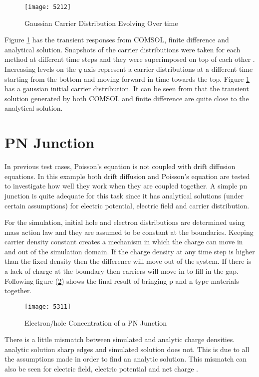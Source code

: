 \begin{doublespace}
\begin{figure}[ht]
\centering
\texttt{[image: 5212]}
\caption{Gaussian Carrier Distribution Evolving Over time} 
\label{51}
\end{figure}

Figure \ref{51} has the transient responses from COMSOL, finite difference and analytical solution. Snapshots of the carrier distributions were taken for each method at different time steps and they were superimposed on top of each other . Increasing levels on the \textit{y} axis represent a carrier distributions at a different time starting from the bottom and moving forward in time towards the top. Figure \ref{51} has a gaussian initial carrier distribution. It can be seen from that the transient solution generated by both COMSOL and finite difference are quite close to the analytical solution.


\clearpage
\section{PN Junction}
In previous test cases, Poisson's equation is not coupled with drift diffusion equations. In this example both drift diffusion and Poisson's equation are tested to investigate how well they work when they are coupled together. A simple pn junction is quite adequate for this task since it has analytical solutions (under certain assumptions) for electric potential, electric field and carrier distribution.

For the simulation, initial hole and electron distributions are determined using mass action law and they are assumed to be constant at the boundaries. Keeping carrier density constant creates a mechanism in which the charge can move in and out of the simulation domain. If the charge density at any time step is higher than the fixed density then the difference will move out of the system. If there is a lack of charge at the boundary then carriers will move in to fill in the gap. Following figure (\ref{npcon}) shows the final result of bringing p and n type materials together. 
 
\begin{figure}[ht]
\centering
\texttt{[image: 5311]}
\caption{Electron/hole Concentration of a PN Junction} 
\label{npcon}
\end{figure}

There is a little mismatch between simulated and analytic charge densities.  analytic solution  sharp edges and  simulated solution does not. This is due to all the assumptions made in order to find an analytic solution. This mismatch can also be seen for electric field, electric potential and net charge .


\end{doublespace}
